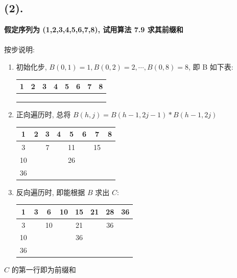 \documentclass[UTF8]{article}
\newcommand{\jumpLine} {\hspace*{\fill} \\}
\begin{document}
\subsection*{(2).}
\noindent \textbf{假定序列为 (1,2,3,4,5,6,7,8), 试用算法 7.9 求其前缀和} \\ \jumpLine\noindent
按步说明:
\begin{enumerate}[(1). ]
	\item 初始化步, $B(0,1)=1, B(0,2)=2, \cdots, B(0,8)=8$, 即 B 如下表:
	\begin{center}
	\begin{tabular}{|c|c|c|c|c|c|c|c|}
		\hline
		1 & 2 & 3 & 4 & 5 & 6 & 7 & 8 \\
		\hline
		&  &  &  &  &  &  &  \\
		\hline
		&  &  &  &  &  &  &  \\
		\hline
		&  &  &  &  &  &  &  \\
		\hline
	\end{tabular}
	\end{center}
	\item 正向遍历时, 总将 $B(h,j)=B(h-1,2j-1) * B(h-1, 2j)$
	\begin{center}
		\begin{tabular}{|c|c|c|c|c|c|c|c|}
			\hline
			1 & 2 & 3 & 4 & 5 & 6 & 7 & 8 \\
			\hline
			3 &  & 7 &  & 11 &  & 15 &  \\
			\hline
			10 &  &  &  & 26 &  &  &  \\
			\hline
			36 &  &  &  &  &  &  &  \\
			\hline
		\end{tabular}
	\end{center}
	\item 反向遍历时, 即能根据 $B$ 求出 $C$:
	\begin{center}
		\begin{tabular}{|c|c|c|c|c|c|c|c|}
			\hline
			1 & 3 & 6 & 10 & 15 & 21 & 28 & 36 \\
			\hline
			3 &  & 10 &  & 21 &  & 36 &  \\
			\hline
			10 &  &  &  & 36 &  &  &  \\
			\hline
			36 &  &  &  &  &  &  &  \\
			\hline
		\end{tabular}
	\end{center}
\end{enumerate}
$C$ 的第一行即为前缀和
\end{document}
